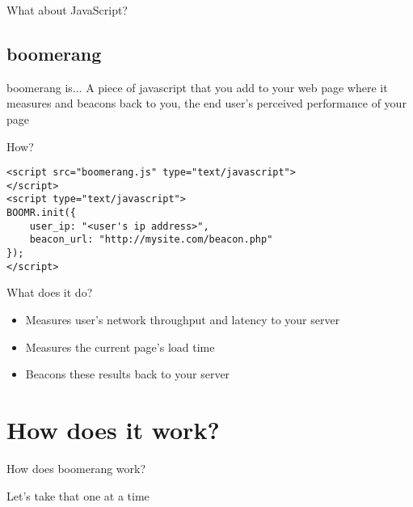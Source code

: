 \documentclass{beamer}
\begin{document}
\begin{frame}{}
  \begin{center}
  What about JavaScript?
  \end{center}
\end{frame}

\subsection{boomerang}

\begin{frame}
  \begin{block}{boomerang is...}
A piece of javascript that you add to your web page where it measures and beacons back to you, the end user's perceived performance of your page
  \end{block}
\end{frame}

\begin{frame}[fragile]{How?}
  \begin{verbatim}
<script src="boomerang.js" type="text/javascript">
</script>
<script type="text/javascript">
BOOMR.init({
    user_ip: "<user's ip address>",
    beacon_url: "http://mysite.com/beacon.php"
});
</script>
  \end{verbatim}
\end{frame}

\begin{frame}{What does it do?}
  \begin{itemize}
  \item Measures user's network throughput and latency to your server
  \item Measures the current page's load time
  \item Beacons these results back to your server
  \end{itemize}
\end{frame}

\section{How does it work?}
\label{sec:internals}

\begin{frame}{}
  \begin{center}
  How does boomerang work?
  \end{center}
\end{frame}

\begin{frame}{}
  \begin{center}
  Let's take that one at a time
  \end{center}
\end{frame}
\end{document}
